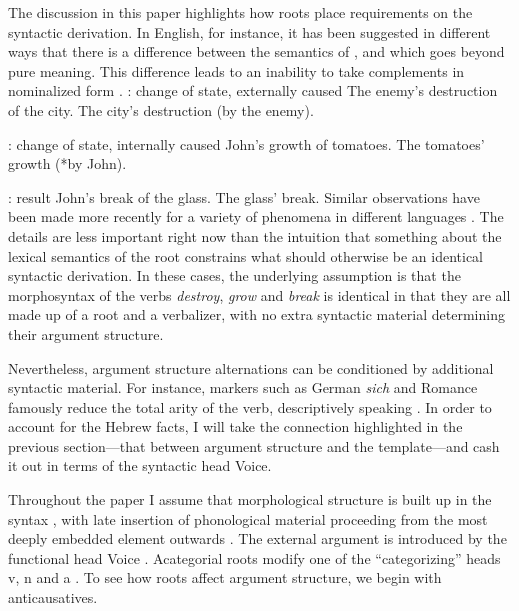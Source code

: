 The discussion in this paper highlights how roots place requirements on the syntactic derivation. In English, for instance, it has been suggested in different ways that there is a difference between the semantics of ,  and  which goes beyond pure meaning. This difference leads to an inability to take complements in nominalized form \citep{chomsky70,marantz97}.
\pex {}: change of state, externally caused
\a The enemy's destruction of the city.
\a The city's destruction (by the enemy).
\xe

\pex {}: change of state, internally caused
\a \ljudge{*} John's growth of tomatoes.
\a The tomatoes' growth (*by John).
\xe

\pex {}: result
\a \ljudge{*} John's break of the glass.
\a \ljudge{*} The glass' break.
\xe
Similar observations have been made more recently for a variety of phenomena in different languages \citep{haspelmath93,unaccusativity95,schaefer08}. The details are less important right now than the intuition that something about the lexical semantics of the root constrains what should otherwise be an identical syntactic derivation. In these cases, the underlying assumption is that the morphosyntax of the verbs \emph{destroy}, \emph{grow} and \emph{break} is identical in that they are all made up of a root and a verbalizer, with no extra syntactic material determining their argument structure.

Nevertheless, argument structure alternations can be conditioned by additional syntactic material. For instance, markers such as German \emph{sich} and Romance  famously reduce the total arity of the verb, descriptively speaking \citep[e.g.][]{labelle08,schaefer08,cuervo14}. In order to account for the Hebrew facts, I will take the connection highlighted in the previous section---that between argument structure and the template---and cash it out in terms of the syntactic head Voice.

Throughout the paper I assume that morphological structure is built up in the syntax \citep{dm}, with late insertion of phonological material proceeding from the most deeply embedded element outwards \citep{bobaljik00,embick10}. The external argument is introduced by the functional head Voice \citep{kratzer96,pylkkanen08}. Acategorial roots modify one of the ``categorizing'' heads v, n and a \citep{marantz97,arad03,harley14thlia}. To see how roots affect argument structure, we begin with anticausatives.


